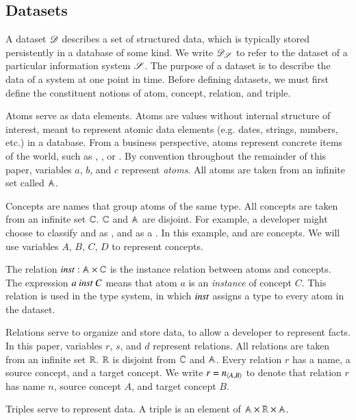 \documentclass{elsarticle}
\begin{document}
\subsection{Datasets}
\label{sct:Datasets}
   A dataset $\mathscr{D}$ describes a set of structured data, which is typically stored persistently in a database of some kind.
   We write $\mathscr{D}_{\mathscr{S}}$ to refer to the dataset of a particular information system $\mathscr{S}$.
   The purpose of a dataset is to describe the data of a system at one point in time. 
   Before defining datasets, we must first define the constituent notions of atom, concept, relation, and triple.
   
   Atoms serve as data elements.
   Atoms are values without internal structure of interest, meant to represent atomic data elements (e.g. dates, strings, numbers, etc.) in a database.
   From a business perspective, atoms represent concrete items of the world,
   such as , , or .
   By convention throughout the remainder of this paper, variables $a$, $b$, and $c$ represent \emph{atoms}.
   All atoms are taken from an infinite set called $\mathbb{A}$.
   
   Concepts are names that group atoms of the same type.
   All concepts are taken from an infinite set $\mathbb{C}$.
   $\mathbb{C}$ and $\mathbb{A}$ are disjoint.
   For example, a developer might choose to classify  and  as ,
   and  as a .
   In this example,  and  are concepts.
   We will use variables $A$, $B$, $C$, $D$ to represent concepts.

   The relation $\text{\it inst\/}:\mathbb{A}\times\mathbb{C}$ is the instance relation between atoms and concepts.
   The expression $a\ \text{\it inst\/}\ C$ means that atom $a$ is an \emph{instance} of concept $C$.
   This relation is used in the type system, in which $\text{\it inst\/}$ assigns a type to every atom in the dataset.

   Relations serve to organize and store data, to allow a developer to represent facts.
   In this paper, variables $r$, $s$, and $d$ represent relations.
   All relations are taken from an infinite set $\mathbb{R}$.
   $\mathbb{R}$ is disjoint from $\mathbb{C}$ and $\mathbb{A}$.
   Every relation $r$ has a name, a source concept, and a target concept.
   We write $r=\text{\it n\/}_{\langle{A},{B}\rangle}$ to denote that relation $r$ has name $n$, source concept $A$, and target concept $B$.

   Triples serve to represent data.
   A triple is an element of $\mathbb{A}\times\mathbb{R}\times\mathbb{A}$.
\end{document}
